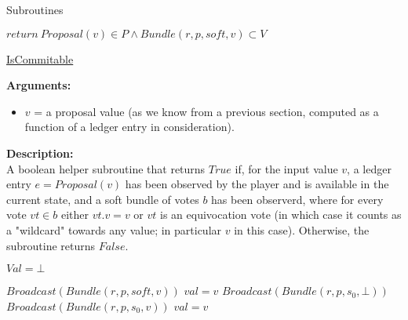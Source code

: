 \documentclass[10pt,a4paper]{article}
\begin{document}
\begin{section}{Subroutines}\label{sect:soubroutines}

\begin{algorithm}[H]
    \begin{algorithmic}[1]

    \State $return \ Proposal(v) \in P \land Bundle(r,p,soft,v) \subset V$

    \EndFunction
    \end{algorithmic}
    \caption{\underline{IsCommitable}}
\end{algorithm}


\noindent \textbf{Arguments:}
\begin{itemize}
    \item $v$ = a proposal value (as we know from a previous section, computed as a function of a ledger entry in consideration).
  \end{itemize}

\noindent \textbf{Description:}\\
A boolean helper subroutine that returns $True$ if, for the input value $v$,
a ledger entry $e = Proposal(v)$ has been observed by the player and is available in the current state,
and a soft bundle of votes $b$ has been observerd, where for every vote $vt \in b$ 
either $vt.v = v$ or $vt$ is an equivocation vote (in which case it counts as a "wildcard" towards 
any value; in particular $v$ in this case). Otherwise, the subroutine returns $False$.


\begin{algorithm}[H]
    \begin{algorithmic}[1]

    \State $Val = \bot$

        \State $Broadcast(Bundle(r, p, soft, v))$
        \State $val = v$    
        \State $Broadcast(Bundle(r, p, s_0, \bot))$
        \State $Broadcast(Bundle(r, p, s_0, v))$
        \State $val = v$   
    \EndIf


\end{algorithmic}
\end{algorithm}
\end{section}
\end{document}
